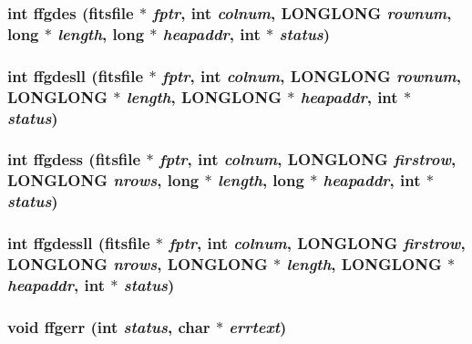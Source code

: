 \subsubsection{\setlength{\rightskip}{0pt plus 5cm}int ffgdes (\bf{fitsfile} $\ast$ {\em fptr}, int {\em colnum}, \bf{LONGLONG} {\em rownum}, long $\ast$ {\em length}, long $\ast$ {\em heapaddr}, int $\ast$ {\em status})}\label{src_2fitsio_8h_c66d84a807557a2d7aa8f1a3b3012100}


\subsubsection{\setlength{\rightskip}{0pt plus 5cm}int ffgdesll (\bf{fitsfile} $\ast$ {\em fptr}, int {\em colnum}, \bf{LONGLONG} {\em rownum}, \bf{LONGLONG} $\ast$ {\em length}, \bf{LONGLONG} $\ast$ {\em heapaddr}, int $\ast$ {\em status})}\label{src_2fitsio_8h_3d39c62a134b069e27cc44a8a51f8536}


\subsubsection{\setlength{\rightskip}{0pt plus 5cm}int ffgdess (\bf{fitsfile} $\ast$ {\em fptr}, int {\em colnum}, \bf{LONGLONG} {\em firstrow}, \bf{LONGLONG} {\em nrows}, long $\ast$ {\em length}, long $\ast$ {\em heapaddr}, int $\ast$ {\em status})}\label{src_2fitsio_8h_7d0b7c25bc1bd32b8f115343aa4abb93}


\subsubsection{\setlength{\rightskip}{0pt plus 5cm}int ffgdessll (\bf{fitsfile} $\ast$ {\em fptr}, int {\em colnum}, \bf{LONGLONG} {\em firstrow}, \bf{LONGLONG} {\em nrows}, \bf{LONGLONG} $\ast$ {\em length}, \bf{LONGLONG} $\ast$ {\em heapaddr}, int $\ast$ {\em status})}\label{src_2fitsio_8h_9d2a8b64f329ddcc261edfacabb4861f}


\subsubsection{\setlength{\rightskip}{0pt plus 5cm}void ffgerr (int {\em status}, char $\ast$ {\em errtext})}\label{src_2fitsio_8h_68877812456ad601bf6d5e8f8d9123c2}


